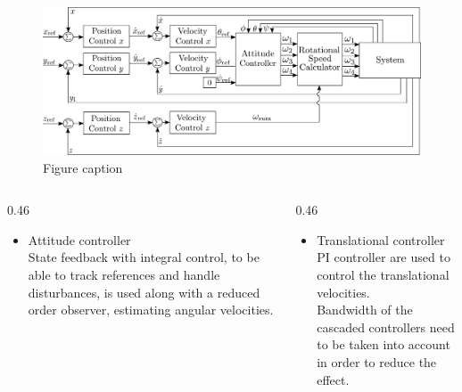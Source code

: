 \begin{figure}
	\includegraphics[width=0.7\linewidth]{figures/TranslationalControlDiagram}
	\caption{Figure caption}
\end{figure}


\begin{columns}[t,totalwidth=\twocolwid] %
	
	\begin{column}{0.46\twocolwid} %
		 \begin{itemize}
			\item Attitude controller\\
			State feedback with integral control, to be able to track references and handle disturbances, is used along with a reduced order observer, estimating angular velocities.
		\end{itemize}
	\end{column} %
	
	\begin{column}{0.46\twocolwid} %
		 \begin{itemize}
			\item Translational controller\\
			PI controller are used to control the translational velocities.\\
			Bandwidth of the cascaded controllers need to be taken into account in order to reduce the effect.
		\end{itemize}		
	\end{column} %
	
\end{columns} %
